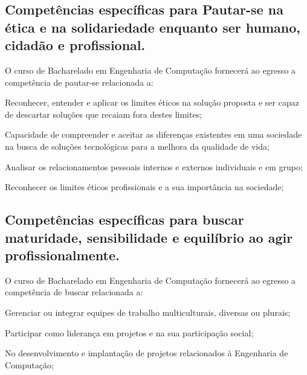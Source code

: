 \subsection*{Competências específicas para Pautar-se na ética e na solidariedade enquanto ser humano, cidadão e profissional.}

O curso de Bacharelado em Engenharia de Computação fornecerá ao egresso a competência de pautar-se relacionada a:
\begin{compitem}
    \item Reconhecer, entender e aplicar os limites éticos na solução proposta e ser capaz de descartar soluções que recaiam fora destes limites;
    \item Capacidade de compreender e aceitar as diferenças existentes em uma sociedade na busca de soluções tecnológicas para a melhora da qualidade de vida; %
    \item Analisar os relacionamentos pessoais internos e externos individuais e em grupo;
    \item Reconhecer os limites éticos profissionais e a sua importância na sociedade;
\end{compitem}

\subsection*{Competências específicas para buscar maturidade, sensibilidade e equilíbrio ao agir profissionalmente.}

O curso de Bacharelado em Engenharia de Computação fornecerá ao egresso a competência de buscar relacionada a:
\begin{compitem}
    \item Gerenciar ou integrar equipes de trabalho multiculturais, diversas ou plurais;%
    \item Participar como liderança em projetos e na sua participação social;
    \item No desenvolvimento e implantação de projetos relacionados à Engenharia de Computação;
\end{compitem}


